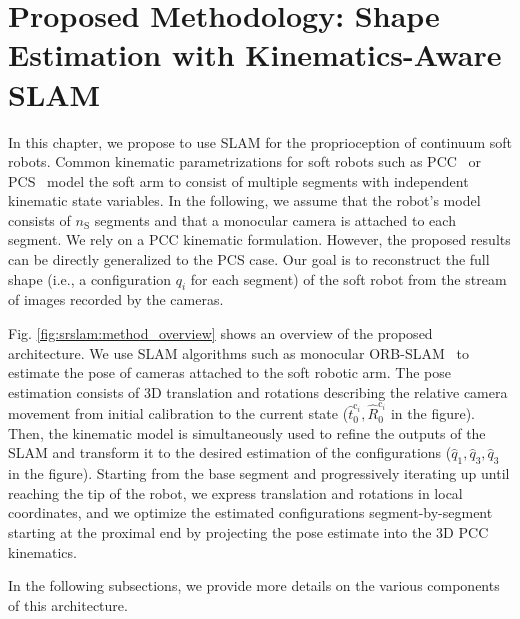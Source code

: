 \section{Proposed Methodology: Shape Estimation with Kinematics-Aware SLAM}
\label{sec:srslam:pose_estimation}

In this chapter, we propose to use \gls{SLAM} for the proprioception of continuum soft robots. Common kinematic parametrizations for soft robots such as \gls{PCC}~\cite{webster2010design} or \gls{PCS}~\cite{renda2018discrete} model the soft arm to consist of multiple segments with independent kinematic state variables. 
In the following, we assume that the robot's model consists of $n_{\mathrm{S}}$ segments and that a monocular camera is attached to each segment. We rely on a \gls{PCC} kinematic formulation. However, the proposed results can be directly generalized to the PCS case.
%
%
Our goal is to reconstruct the full shape (i.e., a configuration $q_i$ for each segment) of the soft robot from the stream of images recorded by the cameras.

Fig. \ref{fig:srslam:method_overview} shows an overview of the proposed architecture.
%
We use \gls{SLAM} algorithms such as monocular ORB-SLAM~\cite{mur2017orb} to estimate the pose of cameras attached to the soft robotic arm.  The pose estimation consists of 3D translation and rotations describing the relative camera movement from initial calibration to the current state ($\hat{t}_0^{\mathrm{c}_i},\hat{R}_0^{\mathrm{c}_i}$ in the figure). Then, the kinematic model is simultaneously used to refine the outputs of the SLAM and transform it to the desired estimation of the configurations ($\hat{q}_1,\hat{q}_3,\hat{q}_3$ in the figure). Starting from the base segment and progressively iterating up until reaching the tip of the robot, we express translation and rotations in local coordinates, and we optimize the estimated configurations segment-by-segment starting at the proximal end by projecting the pose estimate into the 3D \gls{PCC} kinematics.

In the following subsections, we provide more details on the various components of this architecture.

